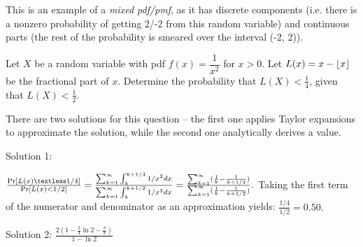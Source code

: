 \documentclass[../main.tex]{subfiles}
\begin{document}

\begin{remark}
    This is an example of a \textit{mixed pdf/pmf}, as it has discrete components (i.e. there is a nonzero probability of getting 2/-2 from this random variable) and continuous parts (the rest of the probability is smeared over the interval (-2, 2)). 
\end{remark}
\begin{example}
	Let $X$ be a random variable with pdf $f(x) = \dfrac{1}{x^2}$ for $x>0$. 
	Let $L(x) = x - \lfloor x\rfloor$ be the fractional part of $x$. Determine the
	probability that $L(X) < \frac14$, given that $L(X) < \frac12$.
\end{example}
\begin{solution}
There are two solutions for this question -- the first one applies Taylor expansions to approximate the solution, while the second one analytically derives a value.


Solution 1: 

$\frac{\Pr[L(x) \textless  1/4]}{\Pr[L(x)<1/2]}=\frac{\sum_{k=1}^{\infty}\int_{k}^{k+1/4} 1/x^2 dx}{\sum_{k=1}^{\infty}\int_{k}^{k+1/2} 1/x^2 dx}=\frac{\sum_{k=1}^{\infty}(\frac{1}{k}-\frac{1}{k+1/4})}{\sum_{k=1}^{\infty}(\frac{1}{k}-\frac{1}{k+1/2})}.$ Taking the first term of the numerator and denominator as an approximation yields: $\frac{1/4}{1/2}=0.50.$


Solution 2:
$\frac{2(1 - \frac34 \ln 2 - \frac \pi 8)}{1-\ln 2}$
\end{solution}
\end{document}
